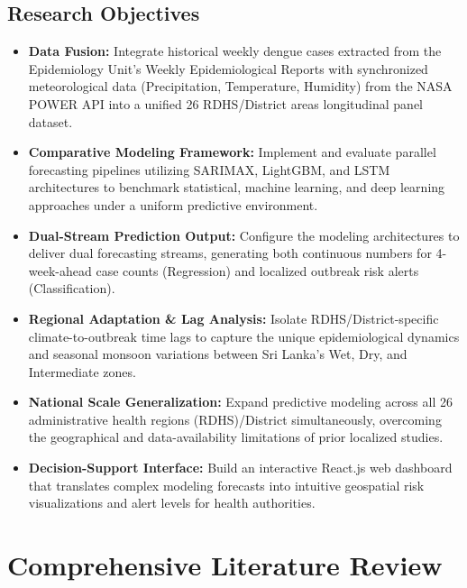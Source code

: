 \documentclass[12pt,a4paper]{article}
\begin{document}
\subsection{Research Objectives}
\begin{itemize}
    \item \textbf{Data Fusion:} Integrate historical weekly dengue cases extracted from the Epidemiology Unit’s Weekly Epidemiological Reports with synchronized meteorological data (Precipitation, Temperature, Humidity) from the NASA POWER API into a unified 26 RDHS\slash District areas longitudinal panel dataset.
    \item \textbf{Comparative Modeling Framework:} Implement and evaluate parallel forecasting pipelines utilizing SARIMAX, LightGBM, and LSTM architectures to benchmark statistical, machine learning, and deep learning approaches under a uniform predictive environment.
    \item \textbf{Dual-Stream Prediction Output:} Configure the modeling architectures to deliver dual forecasting streams, generating both continuous numbers for 4-week-ahead case counts (Regression) and localized outbreak risk alerts (Classification).
    \item \textbf{Regional Adaptation \& Lag Analysis:} Isolate RDHS\slash District-specific climate-to-outbreak time lags to capture the unique epidemiological dynamics and seasonal monsoon variations between Sri Lanka’s Wet, Dry, and Intermediate zones.
    \item \textbf{National Scale Generalization:} Expand predictive modeling across all 26 administrative health regions (RDHS)\slash District simultaneously, overcoming the geographical and data-availability limitations of prior localized studies.
    \item \textbf{Decision-Support Interface:} Build an interactive React.js web dashboard that translates complex modeling forecasts into intuitive geospatial risk visualizations and alert levels for health authorities.
\end{itemize}


\clearpage
\section{Comprehensive Literature Review}
\label{sec:lit_review}
\end{document}
